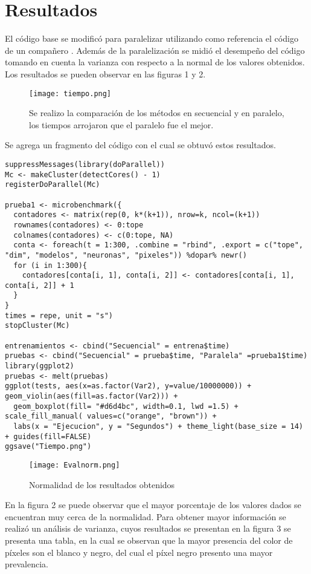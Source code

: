 \documentclass{article}
\begin{document}
\section{Resultados}
El código base \cite{REF1} se modificó para paralelizar utilizando como referencia el código de un compañero \cite{REF3}. Además de la paralelización se midió el desempeño del código tomando en cuenta la varianza con respecto a la normal de los valores obtenidos. Los resultados se pueden observar en las figuras 1 y 2.
\begin{figure}[H]
\centering
\texttt{[image: tiempo.png]}
\caption{Se realizo la comparación de los métodos en secuencial y en paralelo, los tiempos arrojaron que el paralelo fue el mejor.}
\end{figure}
Se agrega un fragmento del código con el cual se obtuvó estos resultados.
\begin{lstlisting}[frame=single]
suppressMessages(library(doParallel))
Mc <- makeCluster(detectCores() - 1)
registerDoParallel(Mc)

prueba1 <- microbenchmark({
  contadores <- matrix(rep(0, k*(k+1)), nrow=k, ncol=(k+1))
  rownames(contadores) <- 0:tope
  colnames(contadores) <- c(0:tope, NA)
  conta <- foreach(t = 1:300, .combine = "rbind", .export = c("tope", "dim", "modelos", "neuronas", "pixeles")) %dopar% newr()
  for (i in 1:300){
    contadores[conta[i, 1], conta[i, 2]] <- contadores[conta[i, 1], conta[i, 2]] + 1
  }
}
times = repe, unit = "s")
stopCluster(Mc)

entrenamientos <- cbind("Secuencial" = entrena$time)
pruebas <- cbind("Secuencial" = prueba$time, "Paralela" =prueba1$time)
library(ggplot2)
pruebas <- melt(pruebas)
ggplot(tests, aes(x=as.factor(Var2), y=value/10000000)) + geom_violin(aes(fill=as.factor(Var2))) + 
  geom_boxplot(fill= "#d6d4bc", width=0.1, lwd =1.5) + scale_fill_manual( values=c("orange", "brown")) +
  labs(x = "Ejecucion", y = "Segundos") + theme_light(base_size = 14) + guides(fill=FALSE) 
ggsave("Tiempo.png")
\end{lstlisting}

\begin{figure}[H]
\centering
\texttt{[image: Evalnorm.png]}
\caption{Normalidad de los resultados obtenidos}
\end{figure}
En la figura 2 se puede observar que el mayor porcentaje de los valores dados se encuentran muy cerca de la normalidad.
Para obtener mayor información se realizó un análisis de varianza, cuyos resultados se presentan en la figura 3 se presenta una tabla, en la cual se observan que la mayor presencia del color de píxeles son el blanco y negro, del cual el píxel negro presento una mayor prevalencia.
\end{document}
